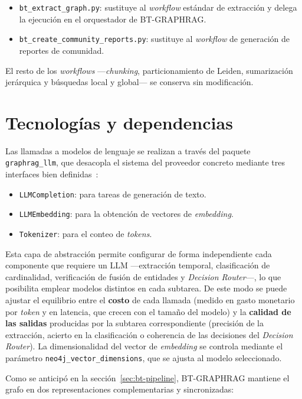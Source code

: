 \begin{itemize}
  \item \texttt{bt\_extract\_graph.py}: sustituye al \emph{workflow} estándar de extracción y delega la ejecución en el orquestador de BT-GRAPHRAG.
  \item \texttt{bt\_create\_community\_reports.py}: sustituye al \emph{workflow} de generación de reportes de comunidad.
\end{itemize}

El resto de los \emph{workflows} ---\emph{chunking}, particionamiento de Leiden, sumarización jerárquica y búsquedas local y global--- se conserva sin modificación.

\section{Tecnologías y dependencias}\label{sec:impl-tech-stack}

Las llamadas a modelos de lenguaje se realizan a través del paquete \texttt{graphrag\_llm}, que desacopla el sistema del proveedor concreto mediante tres interfaces bien definidas~\cite{TODO_llm_components}:

\begin{itemize}
  \item \texttt{LLMCompletion}: para tareas de generación de texto.
  \item \texttt{LLMEmbedding}: para la obtención de vectores de \emph{embedding}.
  \item \texttt{Tokenizer}: para el conteo de \emph{tokens}.
\end{itemize}

Esta capa de abstracción permite configurar de forma independiente cada componente que requiere un LLM ---extracción temporal, clasificación de cardinalidad, verificación de fusión de entidades y \emph{Decision Router}---, lo que posibilita emplear modelos distintos en cada subtarea. De este modo se puede ajustar el equilibrio entre el \textbf{costo} de cada llamada (medido en gasto monetario por \emph{token} y en latencia, que crecen con el tamaño del modelo) y la \textbf{calidad de las salidas} producidas por la subtarea correspondiente (precisión de la extracción, acierto en la clasificación o coherencia de las decisiones del \emph{Decision Router}). La dimensionalidad del vector de \emph{embedding} se controla mediante el parámetro \texttt{neo4j\_vector\_dimensions}, que se ajusta al modelo seleccionado.

Como se anticipó en la sección~\ref{sec:bt-pipeline}, BT-GRAPHRAG mantiene el grafo en dos representaciones complementarias y sincronizadas:

